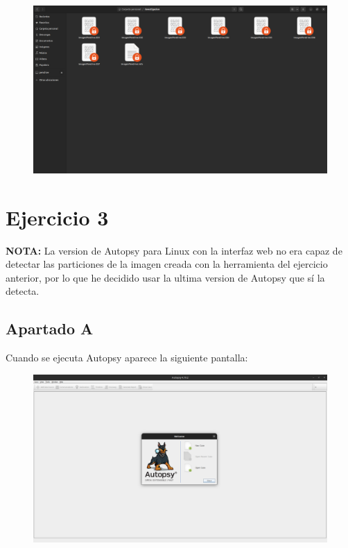 \documentclass{article}
\begin{document}
\begin{figure}[H]
    \centering
    \includegraphics[width=\textwidth]{imagenes/Captura desde 2022-12-02 19-50-53.png}
\end{figure}

\section*{Ejercicio 3}

\textbf{NOTA: }La version de Autopsy para Linux con la interfaz web no era capaz de detectar las particiones de la imagen creada con la herramienta del ejercicio anterior, por lo que he decidido usar la ultima version de Autopsy que sí la detecta.

\subsection*{Apartado A}

Cuando se ejecuta Autopsy aparece la siguiente pantalla:

\begin{figure}[H]
    \centering
    \includegraphics[width=\textwidth]{imagenes/Captura desde 2022-12-03 21-22-16.png}
\end{figure}
\end{document}
